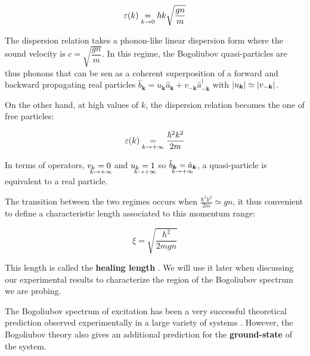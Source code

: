 \begin{equation}
    \varepsilon(k) \underrel{k \to 0}{=} \hbar k \sqrt{\frac{gn}{m}}
\end{equation}

The dispersion relation takes a phonon-like linear dispersion form where the sound velocity is $c=\sqrt{\dfrac{gn}{m}}$. In this regime, the Bogoliubov quasi-particles are thus phonons that can be sen as a coherent superposition of a forward and backward propagating real particles $\hat{b}_{\bm{k}}=u_{\bm{k}} \hat{a}_{\bm{k}} + v_{-\bm{k}} \hat{a}^{\dagger}_{-\bm{k}}$ with $\left\lvert u_{\bm{k}}\right\rvert \simeq \left\lvert v_{-\bm{k}}\right\rvert$.

On the other hand, at high values of $k$, the dispersion relation becomes the one of free particles:

\begin{equation}
    \varepsilon(k) \underrel{k \to +\infty}{=} \frac{\hbar^2 k^2}{2m}
\end{equation}

In terms of operators, $v_k \underrel[c]{k \to +\infty}{=} 0$ and $u_k \underrel[c]{k \to +\infty}{=} 1$ so $\hat{b}_{\bm{k}}\underrel[c]{k \to +\infty}{=}\hat{a}_{\bm{k}}$, a quasi-particle is equivalent to a real particle. 

The transition between the two regimes occurs when $\frac{\hbar^2 k^2}{2m} \simeq gn$, it thus convenient to define a characteristic length associated to this momentum range:

\begin{equation}
    \xi = \sqrt{\frac{\hbar^2}{2mgn}}
\end{equation}

This length is called the \textbf{healing length} . We will use it later when discussing our experimental results to characterize the region of the Bogoliubov spectrum we are probing.

The Bogoliubov spectrum of excitation has been a very successful theoretical prediction observed experimentally in a large variety of systems \cite{miller1962, steinhauer2002excitation, ozeri2005, fontaine2018, stepanov2019}. However, the Bogoliubov theory also gives an additional prediction for the \textbf{ground-state} of the system.

